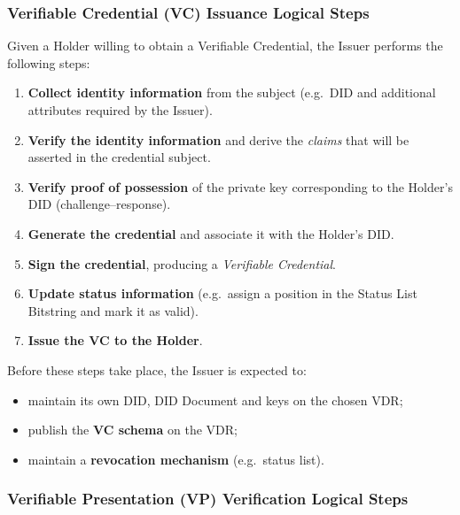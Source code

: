 \subsubsection *{Verifiable Credential (VC) Issuance Logical Steps}

Given a Holder willing to obtain a Verifiable Credential, the Issuer performs the following steps:

\begin{enumerate}
    \item \textbf{Collect identity information} from the subject  
    (e.g.\ DID and additional attributes required by the Issuer).
    
    \item \textbf{Verify the identity information} and derive the \emph{claims} that will
    be asserted in the credential subject.
    
    \item \textbf{Verify proof of possession} of the private key corresponding to the
    Holder's DID (challenge–response).
    
    \item \textbf{Generate the credential} and associate it with the Holder's DID.
    
    \item \textbf{Sign the credential}, producing a \emph{Verifiable Credential}.
    
    \item \textbf{Update status information}  
    (e.g.\ assign a position in the Status List Bitstring and mark it as valid).
    
    \item \textbf{Issue the VC to the Holder}.
\end{enumerate}

\noindent
Before these steps take place, the Issuer is expected to:
\begin{itemize}
    \item maintain its own DID, DID Document and keys on the chosen VDR;
    \item publish the \textbf{VC schema} on the VDR;
    \item maintain a \textbf{revocation mechanism} (e.g.\ status list).
\end{itemize}

\vspace{0.5cm}

\subsubsection *{Verifiable Presentation (VP) Verification Logical Steps}

